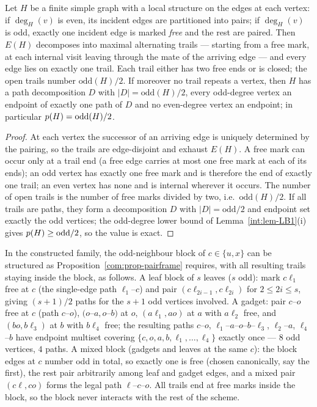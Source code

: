 \begin{proposition}
\label{com:prop-pairframe}
Let $H$ be a finite simple graph with a local structure on the edges at
each vertex: if $\deg_H(v)$ is even, its incident edges are partitioned
into pairs; if $\deg_H(v)$ is odd, exactly one incident edge is marked
\emph{free} and the rest are paired. Then $E(H)$ decomposes into maximal
alternating trails --- starting from a free mark, at each internal visit
leaving through the mate of the arriving edge --- and every edge lies on
exactly one trail. Each trail either has two free ends or is closed; the
open trails number $\mathrm{odd}(H)/2$. If moreover no trail repeats a
vertex, then $H$ has a path decomposition $D$ with
$|D|=\mathrm{odd}(H)/2$, every odd-degree vertex an endpoint of exactly
one path of $D$ and no even-degree vertex an endpoint; in particular
$p(H)=\mathrm{odd}(H)/2$.
\end{proposition}

\begin{proof}
At each vertex the successor of an arriving edge is uniquely determined
by the pairing, so the trails are edge-disjoint and exhaust $E(H)$. A
free mark can occur only at a trail end (a free edge carries at most one
free mark at each of its ends); an odd vertex has exactly one free mark
and is therefore the end of exactly one trail; an even vertex has none
and is internal wherever it occurs. The number of open trails is the
number of free marks divided by two, i.e.\ $\mathrm{odd}(H)/2$. If all
trails are paths, they form a decomposition $D$ with $|D|=\mathrm{odd}/2$
and endpoint set exactly the odd vertices; the odd-degree lower bound of
Lemma~\ref{int:lem-LB1}(i) gives $p(H)\ge\mathrm{odd}/2$, so the value
is exact.
\end{proof}

\begin{lemma}\label{com:lem-blocks}
In the constructed family, the odd-neighbour block of $c\in\{u,x\}$ can
be structured as Proposition~\ref{com:prop-pairframe} requires, with all
resulting trails staying inside the block, as follows. A leaf block of
$s$ leaves ($s$ odd): mark $c\ell_1$ free at $c$ (the single-edge path
$\ell_1$--$c$) and pair $(c\ell_{2i-1},c\ell_{2i})$ for $2\le 2i\le s$,
giving $(s+1)/2$ paths for the $s+1$ odd vertices involved. A gadget:
pair $c$--$o$ free at $c$ (path $c$--$o$), $(o$--$a,o$--$b)$ at $o$,
$(a\ell_1,a o)$ at $a$ with $a\ell_2$ free, and $(b o,b\ell_3)$ at $b$
with $b\ell_4$ free; the resulting paths $c$--$o$,
$\ell_1$--$a$--$o$--$b$--$\ell_3$, $\ell_2$--$a$, $\ell_4$--$b$ have
endpoint multiset covering $\{c,o,a,b,\ell_1,\dots,\ell_4\}$ exactly once
--- $8$ odd vertices, $4$ paths. A mixed block (gadgets and leaves at the
same $c$): the block edges at $c$ number odd in total, so exactly one is
free (chosen canonically, say the first), the rest pair arbitrarily among
leaf and gadget edges, and a mixed pair $(c\ell,c o)$ forms the legal
path $\ell$--$c$--$o$. All trails end at free marks inside the block, so
the block never interacts with the rest of the scheme.
\end{lemma}

